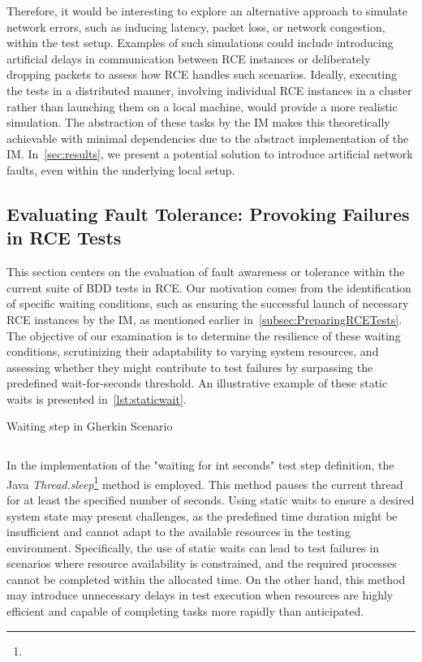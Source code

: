 Therefore, it would be interesting to explore an alternative approach to simulate network errors, such as inducing latency, packet loss, or network congestion, within the test setup. Examples of such simulations could include introducing artificial delays in communication between \ac{RCE} instances or deliberately dropping packets to assess how \ac{RCE} handles such scenarios. Ideally, executing the tests in a distributed manner, involving individual \ac{RCE} instances in a cluster rather than launching them on a local machine, would provide a more realistic simulation. The abstraction of these tasks by the \ac{IM} makes this theoretically achievable with minimal dependencies due to the abstract implementation of the \ac{IM}. In~\cref{sec:results}, we present a potential solution to introduce artificial network faults, even within the underlying local setup.

\subsection{Evaluating Fault Tolerance: Provoking Failures in \ac{RCE} Tests}
\label{subsec:staticwaits}
This section centers on the evaluation of fault awareness or tolerance within the current suite of \ac{BDD} tests in \ac{RCE}. Our motivation comes from the identification of specific waiting conditions, such as ensuring the successful launch of necessary RCE instances by the \ac{IM}, as mentioned earlier in~\cref{subsec:PreparingRCETests}. The objective of our examination is to determine the resilience of these waiting conditions, scrutinizing their adaptability to varying system resources, and assessing whether they might contribute to test failures by surpassing the predefined wait-for-seconds threshold. An illustrative example of these static waits is presented in~\cref{lst:staticwait}.

\begin{listing}[!ht]
\caption{Waiting step in Gherkin Scenario}
\label{lst:staticwait}
\inputminted{gherkin}{files/code/staticwait.feature}
\end{listing}

In the implementation of the "waiting for {int} seconds" test step definition, the Java \textit{Thread.sleep}\footnote{} method is employed. This method pauses the current thread for at least the specified number of seconds. Using static waits to ensure a desired system state may present challenges, as the predefined time duration might be insufficient and cannot adapt to the available resources in the testing environment. Specifically, the use of static waits can lead to test failures in scenarios where resource availability is constrained, and the required processes cannot be completed within the allocated time. On the other hand, this method may introduce unnecessary delays in test execution when resources are highly efficient and capable of completing tasks more rapidly than anticipated.

